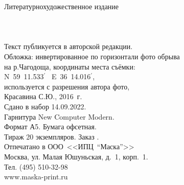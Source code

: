 {
\newpage
\thispagestyle{empty}
\begin{center}
{\small Литературно\sdash художественное издание}\\
\vspace{1.6cm}
{\Large \MyVarAuthorName}\\
\vspace{1.6cm}
{\Large\textbf\MyVarBookName}\\
\vspace{0.4cm}
{\Large\textbf\MyVarBookNamesec}\\
\vspace{1.0cm}
{\small%
Текст публикуется в авторской редакции.\\
\vspace{1.0cm}
Обложка: инвертированное по горизонтали фото обрыва\\
на р.Чагодоща, координаты места съёмки:\\N~59\degree~11.533$^\prime$~ E~36\degree~14.016$^\prime$,\\используется с разрешения автора фото,\\ Красавина С.Ю., 2016~г.\\
\vspace{1.5cm}
Сдано в набор 14.09.2022.\\
Гарнитура New Computer Modern.\\
Формат А5. Бумага офсетная.\\
Тираж 20 экземпляров. Заказ .\\
\vspace{1.0cm}
Отпечатано в ООО~<<ИПЦ~"`Маска"'>>\\
Москва, ул. Малая Юшуньская, д.~1, корп.~1.\\
Тел. (495) 510-32-98\\
www.maska-print.ru
}
\end{center}
}